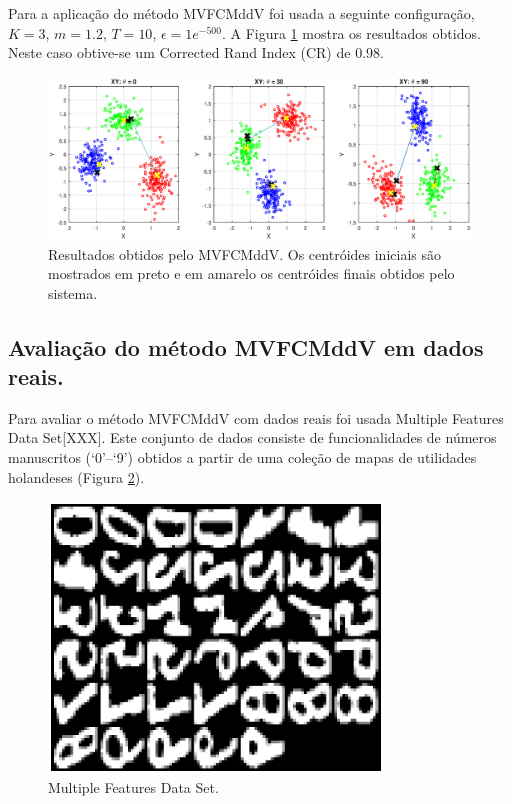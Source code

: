\documentclass[12pt]{article}
\begin{document}
Para a aplicação do método MVFCMddV foi usada a seguinte configuração, $K = 3$, $m = 1.2$, $T = 10$, $\epsilon = 1e^{-500}$. A Figura \ref{fig:cluster_datos_sinteticos} mostra os resultados obtidos. Neste caso obtive-se um Corrected Rand Index (CR) de $0.98$.

\begin{figure}[h]
\centering
\includegraphics[width=4.5in]{../out/clusters-gauss-3.eps}
\caption{Resultados obtidos pelo MVFCMddV. Os centróides iniciais são mostrados em preto e em amarelo os centróides finais obtidos pelo sistema.}
\label{fig:cluster_datos_sinteticos}
\end{figure}  

\subsection{Avaliação do método MVFCMddV em dados reais.}

Para avaliar o método MVFCMddV com dados reais foi usada Multiple Features Data Set[XXX]. Este conjunto de dados consiste de funcionalidades de números manuscritos (`0'--`9') obtidos a partir de uma coleção de mapas de utilidades holandeses (Figura \ref{fig:data_base}).

\begin{figure}[h]
\centering
\includegraphics[width=3.5in]{../out/data-base.eps}
\caption{Multiple Features Data Set.}
\label{fig:data_base}
\end{figure}  
\end{document}
